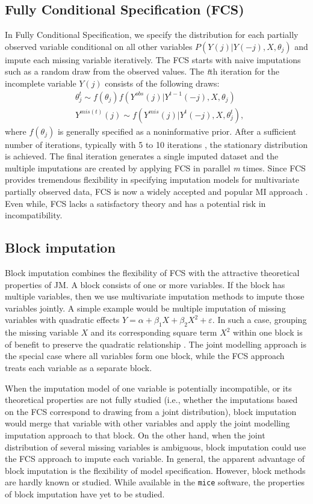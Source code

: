 	\subsection{Fully Conditional Specification (FCS)}
	In Fully Conditional Specification, we specify the distribution for each partially observed variable conditional on all other variables $P(Y(j)|Y(-j), X, \theta_{j})$ and impute each missing variable iteratively. The FCS starts with naive imputations such as a random draw from the observed values. The \emph{t}th iteration for the incomplete variable \emph{$Y(j)$} consists of the following draws:
	\begin{align*}
		&\theta_{j}^{t} \sim f(\theta_{j})f(Y^{obs}(j)|Y^{t-1}(-j), X, \theta_{j})\\
		&Y^{mis(t)}(j) \sim f(Y^{mis}(j)|Y^{t}(-j), X, \theta_{j}^{t}),
	\end{align*}
	where $f(\theta_{j})$ is generally specified as a noninformative prior. After a sufficient number of iterations, typically with 5 to 10 iterations \citep{Buuren2018}, the stationary distribution is achieved. The final iteration generates a single imputed dataset and the multiple imputations are created by applying FCS in parallel \emph{m} times. Since FCS provides tremendous flexibility in specifying imputation models for multivariate partially observed data, FCS is now a widely accepted and popular MI approach \citep{van2007multiple}. Even while, FCS lacks a satisfactory theory and has a potential risk in incompatibility. 
	
	\subsection{Block imputation}
	Block imputation combines the flexibility of FCS with the attractive theoretical properties of JM. A block consists of one or more variables. If the block has multiple variables, then we use multivariate imputation methods to impute those variables jointly. A simple example would be multiple imputation of missing variables with quadratic effects $Y = \alpha + \beta_{1}X + \beta_{2}X^2 + \varepsilon$. In such a case, grouping the missing variable $X$ and its corresponding square term $X^2$ within one block is of benefit to preserve the quadratic relationship \citep{vink2019}. The joint modelling approach is the special case where all variables form one block, while the FCS approach treats each variable as a separate block. 
	
	When the imputation model of one variable is potentially incompatible, or its theoretical properties are not fully studied (i.e., whether the imputations based on the FCS correspond to drawing from a joint distribution), block imputation would merge that variable with other variables and apply the joint modelling imputation approach to that block. On the other hand, when the joint distribution of several missing variables is ambiguous, block imputation could use the FCS approach to impute each variable. In general, the apparent advantage of block imputation is the flexibility of model specification. However, block methods are hardly known or studied. While available in the \texttt{mice} software, the properties of block imputation have yet to be studied.  
	
